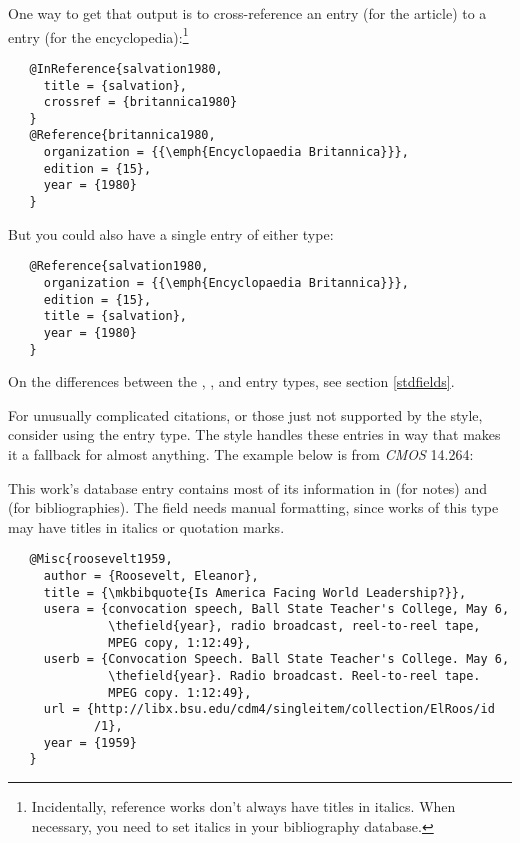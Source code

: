 \documentclass[11pt,letterpaper,oneside]{article}
\begin{document}
\begin{citenobib}
\item \cite{salvation1980}
\end{citenobib}

\noindent One way to get that output is to cross-reference an
 entry (for the article) to a 
entry (for the encyclopedia):\footnote{Incidentally, reference works
don't always have titles in italics. When necessary, you need to set
italics in your bibliography database.}

\begin{verbatim}
   @InReference{salvation1980,
     title = {salvation},
     crossref = {britannica1980}
   }
   @Reference{britannica1980,
     organization = {{\emph{Encyclopaedia Britannica}}},
     edition = {15},
     year = {1980}
   }
\end{verbatim}

\noindent But you could also have a single entry of either type:

\begin{verbatim}
   @Reference{salvation1980,
     organization = {{\emph{Encyclopaedia Britannica}}},
     edition = {15},
     title = {salvation},
     year = {1980}
   }
\end{verbatim}

On the differences between the ,
, and  entry types, see
section \ref{stdfields}.

For unusually complicated citations, or those just not supported by
the style, consider using the  entry type. The style
handles these entries in way that makes it a fallback for almost
anything. The example below is from \textit{CMOS} 14.264:

\begin{citebib}
\item \cite{roosevelt1959}
\end{citebib}

\noindent This work's database entry contains most of its information
in  (for notes) and  (for
bibliographies). The  field needs manual formatting,
since works of this type may have titles in italics or quotation
marks.

\begin{verbatim}
   @Misc{roosevelt1959,
     author = {Roosevelt, Eleanor},
     title = {\mkbibquote{Is America Facing World Leadership?}},
     usera = {convocation speech, Ball State Teacher's College, May 6,
              \thefield{year}, radio broadcast, reel-to-reel tape,
              MPEG copy, 1:12:49},
     userb = {Convocation Speech. Ball State Teacher's College. May 6,
              \thefield{year}. Radio broadcast. Reel-to-reel tape.
              MPEG copy. 1:12:49},
     url = {http://libx.bsu.edu/cdm4/singleitem/collection/ElRoos/id
            /1},
     year = {1959}
   }
\end{verbatim}
\end{document}
